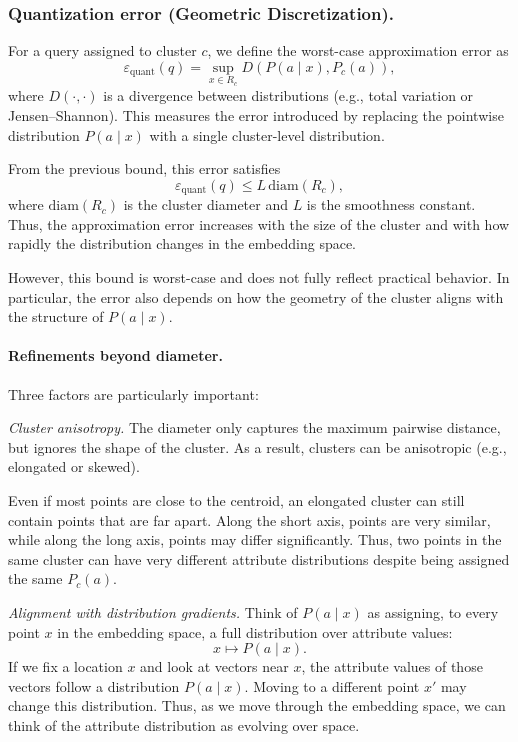 \subsubsection{Quantization error (Geometric Discretization).}
For a query assigned to cluster \(c\), we define the worst-case approximation
error as
\[
\varepsilon_{\mathrm{quant}}(q)
=
\sup_{x \in R_c} D(P(a \mid x), P_c(a)),
\]
where \(D(\cdot,\cdot)\) is a divergence between distributions (e.g., total
variation or Jensen--Shannon). This measures the error introduced by replacing
the pointwise distribution \(P(a \mid x)\) with a single cluster-level
distribution.

From the previous bound, this error satisfies
\[
\varepsilon_{\mathrm{quant}}(q)
\le
L \, \mathrm{diam}(R_c),
\]
where \(\mathrm{diam}(R_c)\) is the cluster diameter and \(L\) is the smoothness
constant. Thus, the approximation error increases with the size of the cluster
and with how rapidly the distribution changes in the embedding space.

However, this bound is worst-case and does not fully reflect practical behavior.
In particular, the error also depends on how the geometry of the cluster aligns
with the structure of \(P(a \mid x)\).

\paragraph{Refinements beyond diameter.}
Three factors are particularly important:

\emph{Cluster anisotropy.}
The diameter only captures the maximum pairwise distance, but ignores the shape
of the cluster. As a result, clusters can be anisotropic (e.g., elongated or
skewed).

Even if most points are close to the centroid, an elongated cluster can still
contain points that are far apart. Along the short axis, points are very
similar, while along the long axis, points may differ significantly. Thus, two
points in the same cluster can have very different attribute distributions
despite being assigned the same \(P_c(a)\).

\emph{Alignment with distribution gradients.}
Think of \(P(a \mid x)\) as assigning, to every point \(x\) in the embedding
space, a full distribution over attribute values:
\[
x \mapsto P(a \mid x).
\]
If we fix a location \(x\) and look at vectors near \(x\), the
attribute values of those vectors follow a distribution \(P(a \mid x)\). Moving
to a different point \(x'\) may change this distribution. Thus, as we move
through the embedding space, we can think of the attribute distribution as
evolving over space.

